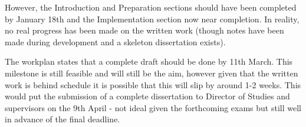 \documentclass[a4paper,12pt]{article}
\begin{document}
However, the Introduction and Preparation sections should have been completed by January 18th and the Implementation section now near completion. In reality, no real progress has been made on the written work (though notes have been made during development and a skeleton dissertation exists).

The workplan states that a complete draft should be done by 11th March. This milestone is still feasible and will still be the aim, however given that the written work is behind schedule it is possible that this will slip by around 1-2 weeks. This would put the submission of a complete dissertation to Director of Studies and supervisors on the 9th April - not ideal given the forthcoming exams but still well in advance of the final deadline.
\end{document}
